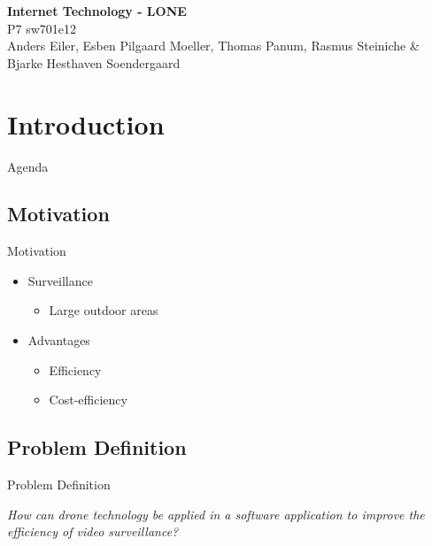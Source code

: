 \author{Rasmus Steiniche}
\begin{frame}{}
	\begin{center}
		\huge \textbf{Internet Technology - LONE}\\
		\normalsize P7 sw701e12\\
		\tiny{Anders Eiler, Esben Pilgaard Moeller, Thomas Panum,}
		\tiny{Rasmus Steiniche \& Bjarke Hesthaven Soendergaard}
	\end{center}
\end{frame}

\section{Introduction}
\begin{frame}{Agenda}{}
\tableofcontents
\end{frame}

\subsection{Motivation}
\begin{frame}{Motivation}
\begin{itemize}
	\item Surveillance
	\begin{itemize}
		\item Large outdoor areas
	\end{itemize}
	\item Advantages
	\begin{itemize}
		\item Efficiency
		\item Cost-efficiency
	\end{itemize}
\end{itemize}
\end{frame}

\subsection{Problem Definition}
\begin{frame}{Problem Definition}
\begin{center}
	\textit{How can drone technology be applied in a software application to improve the efficiency of video surveillance?}
\end{center}
\end{frame}